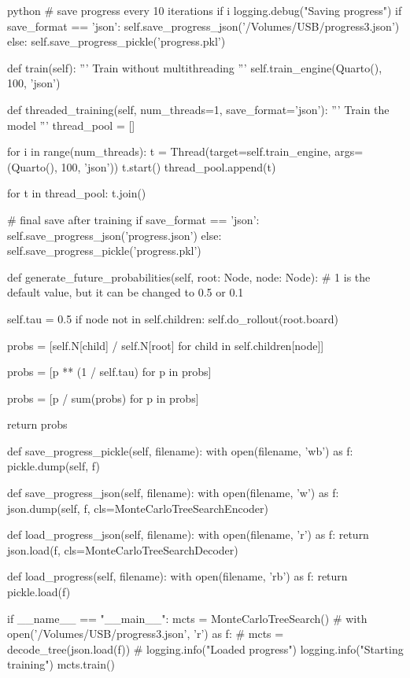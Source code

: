 \begin{mintedbox}{python}
            # save progress every 10 iterations
            if i %
                logging.debug("Saving progress")
                if save_format == 'json':
                    self.save_progress_json('/Volumes/USB/progress3.json')
                else:
                    self.save_progress_pickle('progress.pkl')

    def train(self):
        '''
        Train without multithreading
        '''
        self.train_engine(Quarto(), 100, 'json')

    def threaded_training(self, num_threads=1, save_format='json'):
        '''
        Train the model
        '''
        thread_pool = []

        for i in range(num_threads):
            t = Thread(target=self.train_engine, args=(Quarto(), 100, 'json'))
            t.start()
            thread_pool.append(t)

        for t in thread_pool:
            t.join()

        # final save after training
        if save_format == 'json':
            self.save_progress_json('progress.json')
        else:
            self.save_progress_pickle('progress.pkl')

    def generate_future_probabilities(self, root: Node, node: Node):
        # 1 is the default value, but it can be changed to 0.5 or 0.1

        self.tau = 0.5
        if node not in self.children:
            self.do_rollout(root.board)

        probs = [self.N[child] / self.N[root]
                    for child in self.children[node]]

        probs = [p ** (1 / self.tau) for p in probs]

        probs = [p / sum(probs) for p in probs]

        return probs

    def save_progress_pickle(self, filename):
        with open(filename, 'wb') as f:
            pickle.dump(self, f)

    def save_progress_json(self, filename):
        with open(filename, 'w') as f:
            json.dump(self, f, cls=MonteCarloTreeSearchEncoder)

    def load_progress_json(self, filename):
        with open(filename, 'r') as f:
            return json.load(f, cls=MonteCarloTreeSearchDecoder)

    def load_progress(self, filename):
        with open(filename, 'rb') as f:
            return pickle.load(f)


if __name__ == "__main__":
    mcts = MonteCarloTreeSearch()
    # with open('/Volumes/USB/progress3.json', 'r') as f:
    #     mcts = decode_tree(json.load(f))
    #     logging.info("Loaded progress")
    logging.info("Starting training")
    mcts.train()

\end{mintedbox}


